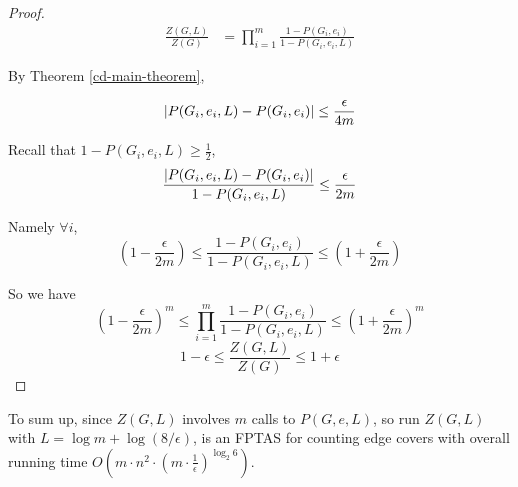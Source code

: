 \begin{proof}

	\begin{align*}
		\frac{Z(G, L)}{Z(G)} &= \prod_{i=1}^m \frac{1-P(G_i, e_i)}{1-P(G_i, e_i, L)}
	\end{align*}

	By Theorem \ref{cd-main-theorem},

	\[\left\vert P(G_i, e_i, L) - P(G_i,e_i)\right\vert \leq \frac{\epsilon}{4m}\]

	Recall that $1-P(G_i,e_i, L) \geq \frac{1}{2}$,
	\[ \frac{\left\vert P(G_i, e_i, L) - P(G_i,e_i)\right\vert}{1 - P(G_i,e_i, L)} \leq \frac{\epsilon}{2m}\]
	
	Namely $\forall i$,
	\[ \left( 1 - \frac{\epsilon}{2m} \right) \leq \frac{1-P(G_i, e_i)}{1 - P(G_i,e_i, L)} \leq \left( 1 + \frac{\epsilon}{2m} \right)\]

	So we have
	\[ \left( 1 - \frac{\epsilon}{2m} \right)^m \leq \prod_{i=1}^m \frac{1-P(G_i, e_i)}{1 - P(G_i,e_i, L)} \leq \left( 1 + \frac{\epsilon}{2m} \right)^m\]
	\[ 1- \epsilon \leq \frac{Z(G, L)}{Z(G)} \leq 1+ \epsilon\]


\end{proof}

To sum up, since $Z(G, L)$ involves $m$ calls to $P(G,e,L)$, so run $Z(G, L)$ with $L = \log m + \log(8/ \epsilon)$, is an FPTAS for counting edge covers with overall running time $O(m \cdot n^2 \cdot ( m\cdot \frac{1}{\epsilon})^ {\log_2 6} )$.
